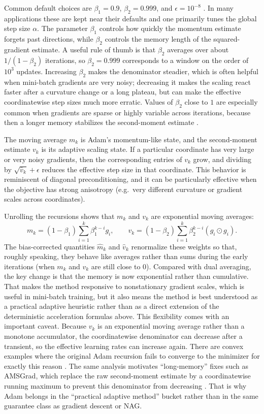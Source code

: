 Common default choices are $\beta_1=0.9$, $\beta_2=0.999$, and $\epsilon=10^{-8}$ \citep[\S2 and Alg.~1]{kingma_ba_2015_adam}.
In many applications these are kept near their defaults and one primarily tunes the global step size $\alpha$.
The parameter $\beta_1$ controls how quickly the momentum estimate forgets past directions, while $\beta_2$ controls the memory length of the squared-gradient estimate.
A useful rule of thumb is that $\beta_2$ averages over about $1/(1-\beta_2)$ iterations, so $\beta_2=0.999$ corresponds to a window on the order of $10^3$ updates.
Increasing $\beta_2$ makes the denominator steadier, which is often helpful when mini-batch gradients are very noisy; decreasing it makes the scaling react faster after a curvature change or a long plateau, but can make the effective coordinatewise step sizes much more erratic.
Values of $\beta_2$ close to $1$ are especially common when gradients are sparse or highly variable across iterations, because then a longer memory stabilizes the second-moment estimate \citep[\S6.4]{kingma_ba_2015_adam}.

The moving average $m_k$ is Adam's momentum-like state, and the second-moment estimate $v_k$ is its adaptive scaling state.
If a particular coordinate has very large or very noisy gradients, then the corresponding entries of $v_k$ grow, and dividing by $\sqrt{\hat v_k}+\epsilon$ reduces the effective step size in that coordinate.
This behavior is reminiscent of diagonal preconditioning, and it can be particularly effective when the objective has strong anisotropy (e.g.\ very different curvature or gradient scales across coordinates).

Unrolling the recursions shows that $m_k$ and $v_k$ are exponential moving averages:
\[
  m_k = (1-\beta_1)\sum_{i=1}^k \beta_1^{k-i} g_i,
  \qquad
  v_k = (1-\beta_2)\sum_{i=1}^k \beta_2^{k-i} (g_i \odot g_i).
\]
The bias-corrected quantities $\hat m_k$ and $\hat v_k$ renormalize these weights so that, roughly speaking, they behave like averages rather than sums during the early iterations (when $m_k$ and $v_k$ are still close to $0$).
Compared with dual averaging, the key change is that the memory is now exponential rather than cumulative.
That makes the method responsive to nonstationary gradient scales, which is useful in mini-batch training, but it also means the method is best understood as a practical adaptive heuristic rather than as a direct extension of the deterministic acceleration formulas above.
This flexibility comes with an important caveat.
Because $v_k$ is an exponential moving average rather than a monotone accumulator, the coordinatewise denominator can decrease after a transient, so the effective learning rates can increase again.
There are convex examples where the original Adam recursion fails to converge to the minimizer for exactly this reason \citep[\S3--\S4]{reddi_kale_kumar_2018_adam_beyond}.
The same analysis motivates ``long-memory'' fixes such as AMSGrad, which replace the raw second-moment estimate by a coordinatewise running maximum to prevent this denominator from decreasing \citep[\S4]{reddi_kale_kumar_2018_adam_beyond}.
That is why Adam belongs in the ``practical adaptive method'' bucket rather than in the same guarantee class as gradient descent or NAG.


